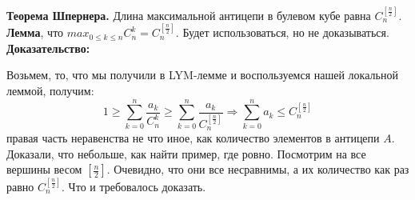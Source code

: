 \noindent \textbf{Теорема Шпернера.} Длина максимальной антицепи в булевом кубе равна $C_{n}^{[\frac{n}{2}]}.$ \\

\noindent \textbf{Лемма}, что $max_{0 \leq k \leq n} C_{n}^{k} = C_{n}^{[\frac{n}{2}]}$. Будет использоваться, но не доказываться. \\

\noindent \textbf{Доказательство:} 

Возьмем, то, что мы получили в LYM-лемме и воспользуемся нашей локальной леммой, получим:
\[
1 \geq \sum_{k = 0}^{n} \frac{a_k}{C_{n}^{k}} \geq \sum_{k = 0}^{n} \frac{a_k}{C_{n}^{[\frac{n}{2}]}} \Rightarrow \sum_{k = 0}^{n} a_k \leq C_{n}^{[\frac{n}{2}]}
\]
правая часть неравенства не что иное, как количество элементов в антицепи $A$. \\

Доказали, что небольше, как найти пример, где ровно. Посмотрим на все вершины весом $[\frac{n}{2}]$. Очевидно, что они все несравнимы, а их количество как раз равно $C_{n}^{[\frac{n}{2}]}$. Что и требовалось доказать.


